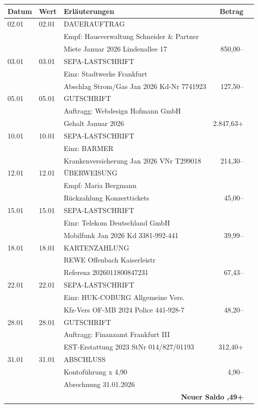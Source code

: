 \documentclass[a4paper,9pt]{article}
\begin{document}
\begin{tabularx}{\textwidth}{l l X r r}
\toprule
\textbf{Datum} & \textbf{Wert} & \textbf{Erl\"auterungen} & \textbf{Betrag} \\
\midrule
\rowcolor{bankgray}
02.01 & 02.01 & DAUERAUFTRAG & \\
      &       & Empf: Hausverwaltung Schneider \& Partner & \\
      &       & Miete Januar 2026 Lindenallee 17 & 850,00-- \\[0.15cm]
03.01 & 03.01 & SEPA-LASTSCHRIFT & \\
      &       & Einz: Stadtwerke Frankfurt & \\
      &       & Abschlag Strom/Gas Jan 2026 Kd-Nr 7741923 & 127,50-- \\[0.15cm]
\rowcolor{bankgray}
05.01 & 05.01 & GUTSCHRIFT & \\
      &       & Auftragg: Webdesign Hofmann GmbH & \\
      &       & Gehalt Januar 2026 & 2.847,63+ \\[0.15cm]
10.01 & 10.01 & SEPA-LASTSCHRIFT & \\
      &       & Einz: BARMER & \\
      &       & Krankenversicherung Jan 2026 VNr T299018 & 214,30-- \\[0.15cm]
\rowcolor{bankgray}
12.01 & 12.01 & \"UBERWEISUNG & \\
      &       & Empf: Maria Bergmann & \\
      &       & R\"uckzahlung Konzerttickets & 45,00-- \\[0.15cm]
15.01 & 15.01 & SEPA-LASTSCHRIFT & \\
      &       & Einz: Telekom Deutschland GmbH & \\
      &       & Mobilfunk Jan 2026 Kd 3381-992-441 & 39,99-- \\[0.15cm]
\rowcolor{bankgray}
18.01 & 18.01 & KARTENZAHLUNG & \\
      &       & REWE Offenbach Kaiserleistr & \\
      &       & Referenz 2026011800847231 & 67,43-- \\[0.15cm]
22.01 & 22.01 & SEPA-LASTSCHRIFT & \\
      &       & Einz: HUK-COBURG Allgemeine Vers. & \\
      &       & Kfz-Vers OF-MB 2024 Police 441-928-7 & 48,20-- \\[0.15cm]
\rowcolor{bankgray}
28.01 & 28.01 & GUTSCHRIFT & \\
      &       & Auftragg: Finanzamt Frankfurt III & \\
      &       & EST-Erstattung 2023 StNr 014/827/01193 & 312,40+ \\[0.15cm]
31.01 & 31.01 & ABSCHLUSS & \\
      &       & Kontof\"uhrung \quad 1 x 4,90 & 4,90-- \\
      &       & Abrechnung 31.01.2026 & \\
\midrule
\multicolumn{4}{r}{\textbf{Neuer Saldo \quad 5.175,49+}} \\
\bottomrule
\end{tabularx}
\end{document}
